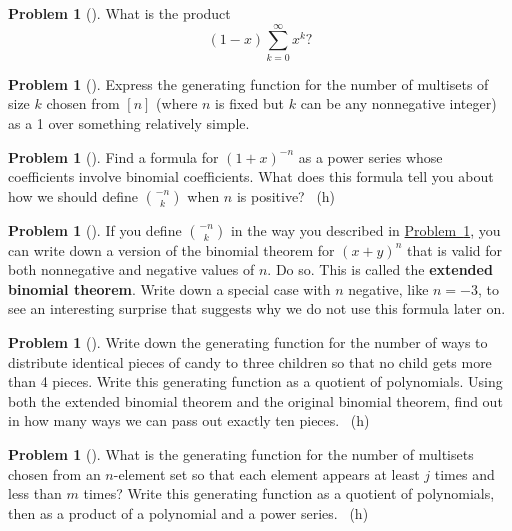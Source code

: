 \documentclass[10pt,]{book}
\newcommand{\terminology}[1]{\textbf{#1}}
\theoremstyle{plain}
\theoremstyle{definition}
\newtheorem{activity}[project]{Problem}
\theoremstyle{definition}
\numberwithin{equation}{chapter}
\begin{document}
\begin{activity}[] \label{activity-193}
\hypertarget{p-1104}{}%
What is the product%
\begin{equation*}
(1-x)\sum_{k=0}^\infty x^k?
\end{equation*}
%
\end{activity}
\begin{activity}[]\marginsymbol[-1em]{} \label{multisetgenfn}
\hypertarget{p-1106}{}%
Express the generating function for the number of multisets of size \(k\) chosen from \([n]\) (where \(n\) is fixed but \(k\) can be any nonnegative integer) as a 1 over something relatively simple.%
\end{activity}
\begin{activity}[] \label{negnchoosek}
\hypertarget{p-1109}{}%
Find a formula for \((1+x)^{-n}\) as a power series whose coefficients involve binomial coefficients. What does this formula tell you about how we should define \(\binom{-n}{k}\) when \(n\) is positive?%
~{\tiny (h)}\end{activity}
\begin{activity}[]\marginsymbol[-1em]{} \label{activity-196}
\hypertarget{p-1113}{}%
If you define \(\binom{-n}{k}\) in the way you described in \hyperref[negnchoosek]{Problem~\ref{negnchoosek}}, you can write down a version of the binomial theorem for \((x+y)^n\) that is valid for both nonnegative and negative values of \(n\). Do so. This is called the \terminology{extended binomial theorem}. Write down a special case with \(n\) negative, like \(n=-3\), to see an interesting surprise that suggests why we do not use this formula later on.%
\end{activity}
\begin{activity}[]\marginsymbol[-1em]{} \label{candygenfn}
\hypertarget{p-1115}{}%
Write down the generating function for the number of ways to distribute identical pieces of candy to three children so that no child gets more than 4 pieces. Write this generating function as a quotient of polynomials. Using both the extended binomial theorem and the original binomial theorem, find out in how many ways we can pass out exactly ten pieces.%
~{\tiny (h)}\end{activity}
\begin{activity}[] \label{activity-198}
\hypertarget{p-1120}{}%
What is the generating function for the number of multisets chosen from an \(n\)-element set so that each element appears at least \(j\) times and less than \(m\) times? Write this generating function as a quotient of polynomials, then as a product of a polynomial and a power series.%
~{\tiny (h)}\end{activity}
\end{document}

